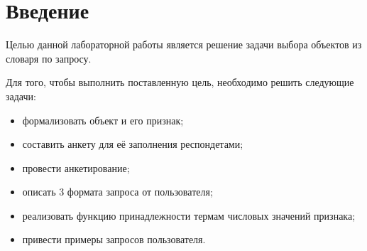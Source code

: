 \chapter*{Введение}

Целью данной лабораторной работы является решение задачи выбора объектов из словаря по запросу.

Для того, чтобы выполнить поставленную цель, необходимо решить следующие задачи:
\begin{itemize}
	\item формализовать объект и его признак;
	\item составить анкету для её заполнения респондетами;
	\item провести анкетирование;
	\item описать 3 формата запроса от пользователя;
	\item реализовать функцию принадлежности термам числовых значений признака;
	\item привести примеры запросов пользователя.
\end{itemize} 



